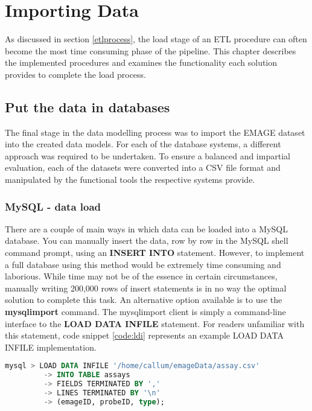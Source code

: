 \chapter{Importing Data}\label{dataload}
As discussed in section \ref{etlprocess}, the load stage of an ETL procedure can often become the most time consuming phase of the pipeline. This chapter describes the implemented procedures and examines the functionality each solution provides to complete the load process.

\section{Put the data in databases}\label{loadsection}
The final stage in the data modelling process was to import the EMAGE dataset into the created data models. For each of the database systems, a different approach was required to be undertaken. To ensure a balanced and impartial evaluation, each of the datasets were converted into a CSV file format and manipulated by the functional tools the respective systems provide.

\subsection{MySQL - data load}
There are a couple of main ways in which data can be loaded into a MySQL database. You can manually insert the data, row by row in the MySQL shell command prompt, using an \textbf{INSERT INTO} statement. However, to implement a full database using this method would be extremely time consuming and laborious. While time may not be of the essence in certain circumstances, manually writing 200,000 rows of insert statements is in no way the optimal solution to complete this task. An alternative option available is to use the \textbf{mysqlimport} command. The mysqlimport client is simply a command-line interface to the \textbf{LOAD DATA INFILE} statement. For readers unfamiliar with this statement, code snippet \ref{code:ldi} represents an example LOAD DATA INFILE implementation.
\newpage
\begin{lstlisting}[language=SQL, caption=Example LOAD DATA INFILE statement., label=code:ldi]
mysql > LOAD DATA INFILE '/home/callum/emageData/assay.csv'
	 	 -> INTO TABLE assays
		 -> FIELDS TERMINATED BY ','
		 -> LINES TERMINATED BY '\n'
		 -> (emageID, probeID, type);
\end{lstlisting}

